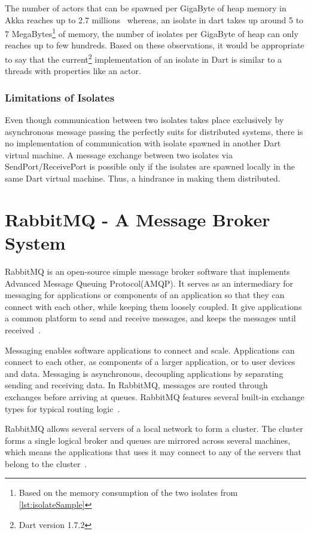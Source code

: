   The number of actors that can be spawned per GigaByte of heap memory in Akka reaches up to 2.7 millions~\cite{akkaHome} whereas, an isolate in dart takes up around 5 to 7 MegaBytes\footnote{Based on the memory consumption of the two isolates from \autoref{lst:isolateSample}} of memory, the number of isolates per GigaByte of heap can only reaches up to few hundreds. Based on these observations, it would be appropriate to say that the current\footnote{Dart version 1.7.2} implementation of an isolate in Dart is \textemdash{} similar to a threads with properties like an actor.

  \subsubsection{Limitations of Isolates}
  Even though communication between two isolates takes place exclusively by asynchronous message passing the perfectly suits for distributed systems, there is no implementation of communication with isolate spawned in another Dart virtual machine. A message exchange between two isolates via SendPort/ReceivePort is possible only if the isolates are spawned locally in the same Dart virtual machine. Thus, a hindrance in making them distributed.

\section{RabbitMQ - A Message Broker System}
\label{sec:rabbitmq}
  RabbitMQ is an open-source simple message broker software that implements Advanced Message Queuing Protocol(AMQP). It serves as an intermediary for messaging for applications or components of an application so that they can connect with each other, while keeping them loosely coupled. It give applications a common platform to send and receive messages, and keeps the messages until received~\cite{rabbitmqFeatures}.

  Messaging enables software applications to connect and scale. Applications can connect to each other, as components of a larger application, or to user devices and data. Messaging is asynchronous, decoupling applications by separating sending and receiving data. In RabbitMQ, messages are routed through exchanges before arriving at queues. RabbitMQ features several built-in exchange types for typical routing logic~\cite{rabbitmqFeatures}.

  RabbitMQ allows several servers of a local network to form a cluster. The cluster forms a single logical broker and queues are mirrored across several machines, which means the applications that uses it may connect to any of the servers that belong to the cluster~\cite{rabbitmqFeatures}.

